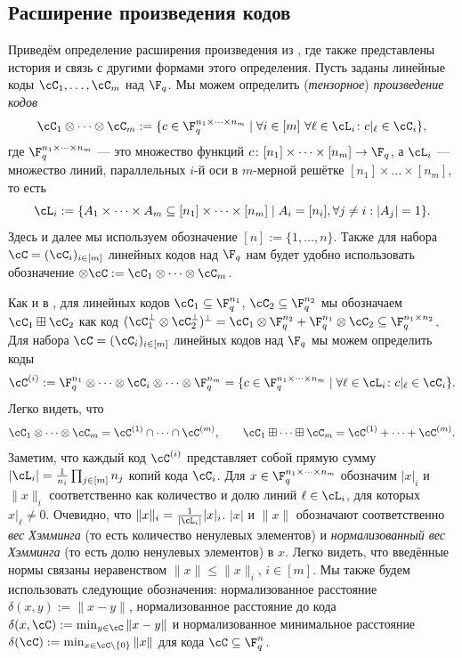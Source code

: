 \documentclass[russian]{intsys}
\begin{document}
\subsection{Расширение произведения кодов}
Приведём определение расширения произведения из \cite{PK2022robust}, где также представлены история и связь с другими формами этого определения.
Пусть заданы линейные коды $\cC_1,\dots,\cC_m$ над $\F_q$. Мы можем определить (\emph{тензорное}) \emph{произведение кодов}
\[
\cC_1\otimes\dots\otimes\cC_m := \{c\in \F_q^{n_1\times\dots\times n_m} \mid \forall i\in [m]\ \forall \ell\in \cL_i\colon c|_\ell\in  \cC_i\},
\]
где $\F_q^{n_1\times\dots\times n_m}$ --- это множество функций $c\colon[n_1]\times \dots\times [n_m] \to \F_q$, а $\cL_i$ --- множество линий, параллельных $i$-й оси в $m$-мерной решётке $[n_1]\times \dots\times [n_m]$, то есть
\[
\cL_i := \{A_1\times\dots\times A_m\subseteq [n_1]\times \dots\times [n_m]\mid A_i=[n_i], \forall j\ne i: |A_j|=1 \}.
\]
Здесь и далее мы используем обозначение $[n]:=\{1,\dots,n\}$. Также для набора $\cC = (\cC_i)_{i\in [m]}$ линейных кодов над $\F_q$ нам будет удобно использовать обозначение $\otimes \cC:=\cC_1\otimes\dots\otimes \cC_m$.

Как и в \cite{PK2022robust}, для линейных кодов $\cC_1\subseteq \F_q^{n_1}$, $\cC_2\subseteq \F_q^{n_2}$ мы обозначаем $\cC_1\boxplus \cC_2$ как код $(\cC_1^\bot\otimes \cC_2^\bot)^\bot=\cC_1\otimes \F_q^{n_2}+\F_q^{n_1}\otimes \cC_2 \subseteq \F_q^{n_1\times n_2}$.
Для набора $\cC = (\cC_i)_{i\in [m]}$ линейных кодов над $\F_q$ мы можем определить коды 
\[
\cC^{(i)} := \F_q^{n_1} \otimes\dots\otimes \cC_i \otimes\dots\otimes \F_q^{n_m} = \{ c\in \F_q^{n_1\times\dots\times n_m} \mid \forall \ell\in \cL_i\colon c|_\ell\in  \cC_i \} .
\]
Легко видеть, что \[
    \cC_1\otimes \dots \otimes \cC_m = \cC^{(1)}\cap \dots \cap \cC^{(m)}, \qquad 
    \cC_1\boxplus \dots \boxplus \cC_m = \cC^{(1)}+ \dots + \cC^{(m)}.
\]
Заметим, что каждый код $\cC^{(i)}$ представляет собой прямую сумму $|\cL_i| = \frac{1}{n_i}\prod_{j\in [m]} n_j$ копий кода $\cC_i$. 
Для $x\in \F_q^{n_1\times\dots\times n_m}$ обозначим $|x|_i$ и $\|x\|_i$ соответственно как количество и долю линий $\ell\in\cL_i$, для которых $x|_\ell \ne 0$.
Очевидно, что $\|x\|_i = \frac{1}{|\cL_i|}|x|_i$. $|x|$ и $\|x\|$ обозначают соответственно \emph{вес Хэмминга} (то есть количество ненулевых элементов) и \emph{нормализованный вес Хэмминга} (то есть долю ненулевых элементов) в $x$.  Легко видеть, что введённые нормы связаны неравенством $\|x\|\le \|x\|_i$, $i\in [m]$.
Мы также будем использовать следующие обозначения: нормализованное расстояние $\delta(x,y):=\|x-y\|$, нормализованное расстояние до кода $\delta(x,\cC):=\min_{y\in\cC}\|x-y\|$ и нормализованное минимальное расстояние $\delta(\cC):=\min_{x\in\cC\setminus \{0\}}\|x\|$ для кода $\cC\subseteq\F_q^n$.
\end{document}
